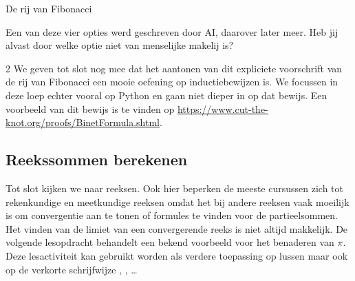 \begin{lesactiviteit}{De rij van Fibonacci}
\begin{vraagenantwoord}
        Een van deze vier opties werd geschreven door AI, daarover later meer. Heb jij alvast door welke optie niet van menselijke makelij is?
        
        

            
        \end{vraagenantwoord}
        \end{lesactiviteit}
        \begin{multicols}{2}
        We geven tot slot nog mee dat het aantonen van dit expliciete voorschrift van de rij van Fibonacci een mooie oefening op inductiebewijzen is. We focussen in deze loep echter vooral op Python en gaan niet dieper in op dat bewijs. Een voorbeeld van dit bewijs is te vinden op \url{https://www.cut-the-knot.org/proofs/BinetFormula.shtml}.
        \subsection{Reekssommen berekenen}
        Tot slot kijken we naar reeksen. Ook hier beperken de meeste cursussen zich tot rekenkundige en meetkundige reeksen omdat het bij andere reeksen vaak moeilijk is om convergentie aan te tonen of formules te vinden voor de partieelsommen. Het vinden van de limiet van een convergerende reeks is niet altijd makkelijk. De volgende lesopdracht behandelt een bekend voorbeeld voor het benaderen van $\pi$. Deze lesactiviteit kan gebruikt worden als verdere toepassing op lussen maar ook op de verkorte schrijfwijze \inline{+=}, \inline{-=}, \ldots

        \end{multicols}
